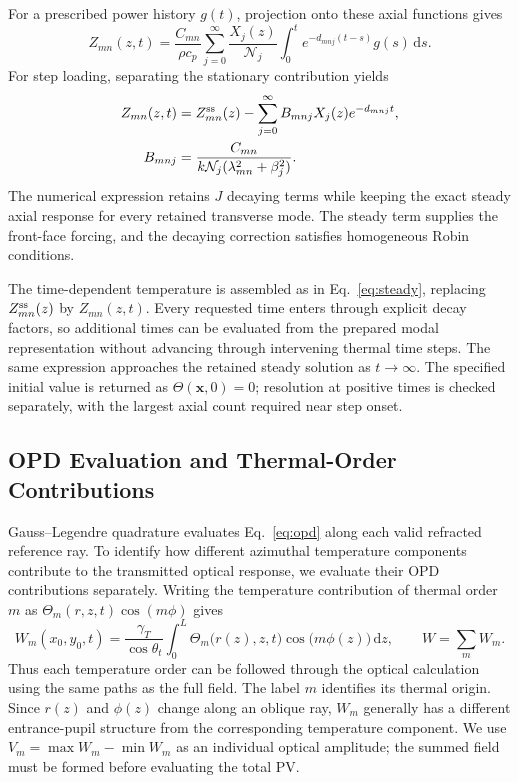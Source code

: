 \documentclass{optica-article}
\newcommand{\dd}{\,\mathrm{d}}
\begin{document}
For a prescribed power history $g(t)$, projection onto these axial functions gives
\begin{equation}
 Z_{mn}(z,t)=\frac{C_{mn}}{\rho c_p}
 \sum_{j=0}^{\infty}\frac{X_j(z)}{\mathcal N_j}
 \int_0^t e^{-d_{mnj}(t-s)}g(s)\dd s.
 \label{eq:convolution}
\end{equation}
For step loading, separating the stationary contribution yields
\begin{align}
 Z_{mn}(z,t)&=Z_{mn}^{\rm ss}(z)
       -\sum_{j=0}^{\infty}B_{mnj}X_j(z)e^{-d_{mnj}t},\label{eq:completion}\\
 B_{mnj}&=\frac{C_{mn}}{k\mathcal N_j(\lambda_{mn}^2+\beta_j^2)}.\nonumber
\end{align}
The numerical expression retains $J$ decaying terms while keeping the exact steady axial response for every retained transverse mode.
The steady term supplies the front-face forcing, and the decaying correction satisfies homogeneous Robin conditions.

The time-dependent temperature is assembled as in Eq.~\eqref{eq:steady}, replacing $Z_{mn}^{\rm ss}(z)$ by $Z_{mn}(z,t)$.
Every requested time enters through explicit decay factors, so additional times can be evaluated from the prepared modal representation without advancing through intervening thermal time steps.
The same expression approaches the retained steady solution as $t\to\infty$.
The specified initial value is returned as $\Theta(\mathbf{x},0)=0$; resolution at positive times is checked separately, with the largest axial count required near step onset.

\subsection{OPD Evaluation and Thermal-Order Contributions}\label{sec:thermal-order}
Gauss--Legendre quadrature evaluates Eq.~\eqref{eq:opd} along each valid refracted reference ray.
To identify how different azimuthal temperature components contribute to the transmitted optical response, we evaluate their OPD contributions separately.
Writing the temperature contribution of thermal order $m$ as $\Theta_m(r,z,t)\cos(m\phi)$ gives
\[
 W_m(x_0,y_0,t)=\frac{\gamma_T}{\cos\theta_t}
 \int_0^L\Theta_m\bigl(r(z),z,t\bigr)\cos\bigl(m\phi(z)\bigr)\dd z,
 \qquad W=\sum_m W_m.
\]
Thus each temperature order can be followed through the optical calculation using the same paths as the full field.
The label $m$ identifies its thermal origin.
Since $r(z)$ and $\phi(z)$ change along an oblique ray, $W_m$ generally has a different entrance-pupil structure from the corresponding temperature component.
We use $V_m=\max W_m-\min W_m$ as an individual optical amplitude; the summed field must be formed before evaluating the total PV.
\end{document}
